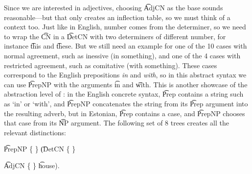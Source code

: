 

\noindent Since we are interested in adjectives, choosing \t{AdjCN} as
the base sounds reasonable---but that only creates an inflection
table, so we must think of a context too. Just like in English, number
comes from the determiner, so we need to wrap the \t{CN} in a \t{DetCN}
with two determiners of different number, for instance \t{this} and
\t{these}. But we still need an example for one of the 10 cases with
normal agreement, such as inessive (in something), and one of the 4
cases with restricted agreement, such as comitative (with something).
These cases correspond to the English prepositions \emph{in} and \emph{with},
so in this abstract syntax we can use \t{PrepNP} with the arguments
\t{in} and \t{with}. This is another showcase of the abstraction level
of \gf{}: in the English concrete syntax, \t{Prep} contains a string
such as `in' or `with', and \t{PrepNP} concatenates the string from its
\t{Prep} argument into the resulting adverb, but in Estonian, \t{Prep}
contains a case, and \t{PrepNP} chooses that case from its \t{NP} argument.
The following set of 8 trees creates all the relevant
distinctions:
\begin{EmptyItem}
 \t{PrepNP}  \{  \} 
             \t{(DetCN}  \{  \}
              
             \t{AdjCN}  \{ \} 
             \t{house)}.
\end{EmptyItem}
